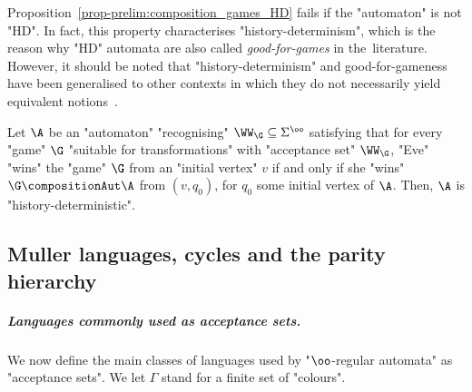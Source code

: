 \documentclass[10pt,a4paper]{amsart}
\begin{document}
Proposition~\ref{prop-prelim:composition_games_HD} fails if the "automaton" is not "HD". In fact, this property characterises "history-determinism", which is the reason why "HD" automata are also called \emph{good-for-games} in the~literature. However, it should be noted that "history-determinism" and good-for-gameness have been generalised to other contexts in which they do not necessarily yield equivalent notions~\cite{BL21HDvsGFG,Colcombet2009CostFunctions}.

\begin{proposition}[\cite{HP06}]\label{prop:HD-iff-GFG}
	Let $\A$ be an "automaton" "recognising" $\WW_{\G}\subseteq \Sigma^\oo$ satisfying that for every "game" $\G$ "suitable for transformations"  with "acceptance set" $\WW_\G$, "Eve" "wins" the "game" $\G$ from an "initial vertex" $v$ if and only if she "wins" $\G \compositionAut \A$ from $(v,q_0)$, for $q_0$  some initial vertex of $\A$. Then, $\A$ is "history-deterministic".
\end{proposition}

\subsection{Muller languages, cycles and the parity hierarchy}\label{subsect-prelim:acceptance-conditions}

\subparagraph{Languages commonly used as acceptance sets.}
We now define the main classes of languages used by "$\oo$-regular automata" as "acceptance sets".
We let $\Gamma$ stand for a finite set of "colours".
\end{document}
